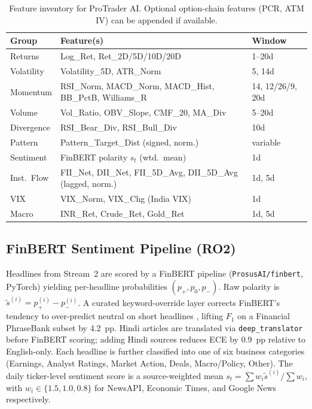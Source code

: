 \documentclass[12pt,a4paper]{article}
\begin{document}
\begin{table}[h]
\centering
\caption{Feature inventory for ProTrader AI. Optional option-chain features
(PCR, ATM IV) can be appended if available.}
\label{tab:features}
\footnotesize\setlength{\tabcolsep}{3pt}
\begin{tabular}{lll}
\toprule
\textbf{Group} & \textbf{Feature(s)} & \textbf{Window} \\
\midrule
Returns      & Log\_Ret, Ret\_2D/5D/10D/20D               & 1--20d \\
Volatility   & Volatility\_5D, ATR\_Norm                 & 5, 14d \\
Momentum     & RSI\_Norm, MACD\_Norm, MACD\_Hist,
               BB\_PctB, Williams\_R                    & 14, 12/26/9, 20d \\
Volume       & Vol\_Ratio, OBV\_Slope, CMF\_20, MA\_Div  & 5--20d \\
Divergence   & RSI\_Bear\_Div, RSI\_Bull\_Div            & 10d \\
Pattern      & Pattern\_Target\_Dist (signed, norm.)      & variable \\
Sentiment    & FinBERT polarity $s_t$ (wtd.\ mean)       & 1d \\
Inst.\ Flow  & FII\_Net, DII\_Net, FII\_5D\_Avg,
               DII\_5D\_Avg (lagged, norm.)              & 1d, 5d \\
VIX          & VIX\_Norm, VIX\_Chg (India VIX)          & 1d \\
Macro        & INR\_Ret, Crude\_Ret, Gold\_Ret           & 1d, 5d \\
\bottomrule
\end{tabular}
\end{table}

\subsection{FinBERT Sentiment Pipeline (RO2)}

Headlines from Stream~2 are scored by a FinBERT pipeline \cite{r12,r31}
(\texttt{ProsusAI/finbert}, PyTorch) yielding per-headline probabilities
$(p_+,p_0,p_-)$. Raw polarity is $\tilde{s}^{(i)}=p_+^{(i)}-p_-^{(i)}$.
A curated keyword-override layer corrects FinBERT's tendency to over-predict
neutral on short headlines \cite{r7}, lifting $F_1$ on a Financial PhraseBank
subset \cite{r35} by 4.2~pp. Hindi articles are translated via
\texttt{deep\_translator} before FinBERT scoring; adding Hindi sources reduces
ECE by 0.9~pp relative to English-only. Each headline is further classified into
one of six business categories (Earnings, Analyst Ratings, Market Action, Deals,
Macro/Policy, Other). The daily ticker-level sentiment score is a source-weighted
mean $s_t=\sum w_i\tilde{s}^{(i)}/\sum w_i$, with $w_i\!\in\!\{1.5,1.0,0.8\}$
for NewsAPI, Economic Times, and Google News respectively.
\end{document}
